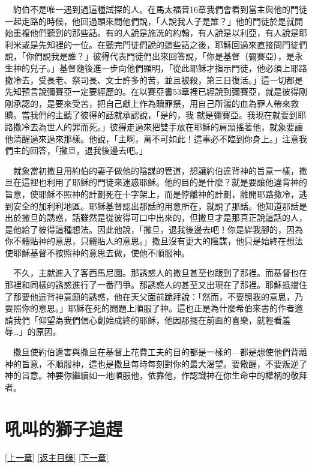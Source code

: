 \documentclass{book}
\begin{document}
　約伯不是唯一遇到過這種試探的人。在馬太福音16章我們會看到當主與他的門徒一起走路的時候，他回過頭來問他們說，「人說我人子是誰？」他的門徒於是就開始重複他們聽到的那些話。有的人說是施洗的約翰，有人說是以利亞，有人說是耶利米或是先知裡的一位。在聽完門徒們說的這些話之後，耶穌回過來直接問門徒們說，「你們說我是誰？」彼得代表門徒們出來回答說，「你是基督（彌賽亞），是永生神的兒子。」基督隨後進一步向他們顯明，「從此耶穌才指示門徒，他必須上耶路撒冷去，受長老、祭司長、文士許多的苦，並且被殺，第三日復活。」這一切都是先知預言說彌賽亞一定要經歷的。在以賽亞書53章裡已經說到彌賽亞，就是彼得剛剛承認的，是要來受苦，把自己獻上作為贖罪祭，用自己所灑的血為罪人帶來救贖。當我們的主聽了彼得的話就承認說，「是的，我 就是彌賽亞。我現在就要到耶路撒冷去為世人的罪而死。」彼得走過來把雙手放在耶穌的肩頭搖著他，就象要讓他清醒過來過來那樣。他說，「主啊，萬不可如此！這事必不臨到你身上。」注意我們主的回答，「撒旦，退我後邊去吧。」

　就象當初撒旦用約伯的妻子做他的陰謀的管道，想讓約伯違背神的旨意一樣，撒旦在這裡也利用了耶穌的門徒來迷惑耶穌。他的目的是什麼？就是要讓他違背神的旨意，使耶穌不照神的計劃死在十字架上，而是悖離神的計劃，離開耶路撒冷，逃到安全的加利利地區。耶穌基督認出那話的用意所在，就說了那話。他知道那話是出於撒旦的誘惑，話雖然是從彼得可口中出來的，但撒旦才是那真正說這話的人，是他給了彼得這種想法。因此他說，「撒旦，退我後邊去吧！你是絆我腳的，因為你不體貼神的意思，只體貼人的意思。」撒旦沒有更大的陰謀，他只是始終在想法使耶穌基督不按照神的意思去做，使他不順服神。

　不久，主就進入了客西馬尼園。那誘惑人的撒旦甚至也跟到了那裡。而基督也在那裡和同樣的誘惑進行了一番鬥爭。那誘惑人的甚至又出現在了那裡。耶穌抵擋住了那要他違背神意願的誘惑，他在天父面前跪拜說：「然而，不要照我的意思，乃要照你的意思。」耶穌在死的問題上順服了神。這也正是為什麼希伯來書的作者邀請我們「仰望為我們信心創始成終的耶穌，他因那擺在前面的喜樂，就輕看羞辱…」的原因。

　撒旦使約伯遭害與撒旦在基督上花費工夫的目的都是一樣的---都是想使他們背離神的旨意，不順服神，這也是撒旦每時每刻對你的最大渴望。要儆醒，不要叛逆了神的旨意。神要你繼續如一地順服他，依靠他，作認識神在你生命中的權柄的敬拜者。

\chapter{吼叫的獅子追趕}
\label{sec:ch10}
\hyperref[sec:ch09]{[上一章]}
\hyperlink{toc}{[返主目錄]}
\hyperref[sec:ch11]{[下一章]}
\end{document}
